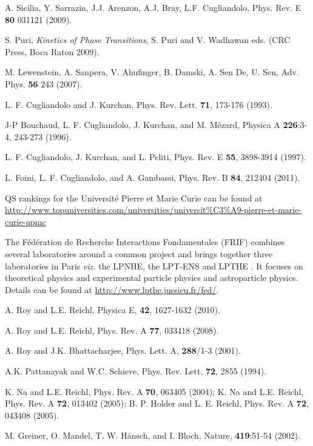 \documentclass[a4paper,11pt,color]{article}
\renewenvironment{thebibliography}[1]{%
    \begin{oldthebibliography}{#1}%
      \setlength{\parskip}{0ex}%
      \setlength{\itemsep}{0ex}%
  }%
  {%
    \end{oldthebibliography}%
  }
\begin{document}
\begin{thebibliography}{}
A. Sicilia, Y. Sarrazin, J.J. Arenzon, A.J. Bray, L.F. Cugliandolo, Phys. Rev. E {\bf 80} 031121 (2009).

S. Puri, \textit{Kinetics of Phase Transitions}, S. Puri and V. Wadhawan eds. (CRC Press, Boca Raton 2009).

M. Lewenstein, A. Sanpera, V. Ahufinger, B. Damski, A. Sen De, U. Sen, Adv. Phys. {\bf 56}
243 (2007).

L. F. Cugliandolo and J. Kurchan,  Phys. Rev. Lett. {\bf 71}, 173-176 (1993).

J-P Bouchaud, L. F. Cugliandolo, J. Kurchan, and M. M\'ezard, Physica A {\bf 226}:3-4, 243-273 (1996).

L. F. Cugliandolo, J. Kurchan, and L. Peliti,  Phys. Rev. E {\bf 55}, 3898-3914 (1997). 

L. Foini, L. F. Cugliandolo, and A. Gambassi, Phys. Rev. B {\bf 84}, 212404 (2011).

QS rankings for the Universit\'e Pierre et Marie Curie can be found at \url{http://www.topuniversities.com/universities/universit\%C3\%A9-pierre-et-marie-curie-upmc}

The F\'ed\'eration de Recherche Interactions Fondamentales (FRIF) combines several laboratories around a common project and brings together three laboratories in Paris \textit{viz.} the LPNHE, the LPT-ENS and LPTHE . It focuses on theoretical physics and experimental particle physics and astroparticle physics. Details can be found at  \url{http://www.lpthe.jussieu.fr/fed/}.

A. Roy and L.E. Reichl,  Physica {E}, {\bf 42}, 1627-1632 (2010). 

A. Roy and L.E. Reichl,  Phys. Rev. {A} {\bf 77}, 033418 (2008).

A. Roy and J.K. Bhattacharjee, Phys. Lett. {A}, {\bf 288}/1-3 (2001).

A.K. Pattanayak and W.C. Schieve, Phys. Rev. Lett. {\bf 72}, 2855 (1994).

K. Na and L.E. Reichl, Phys. Rev. A {\bf 70}, 063405 (2004); K. Na and L.E. Reichl, Phys. Rev. A {\bf 72}, 013402 (2005); B. P. Holder and L. E. Reichl, Phys. Rev. A {\bf 72}, 043408 (2005).

M. Greiner, O. Mandel, T. W. H\"ansch, and I. Bloch, Nature, {\bf 419}:51-54 (2002).


\end{thebibliography}
\end{document}
